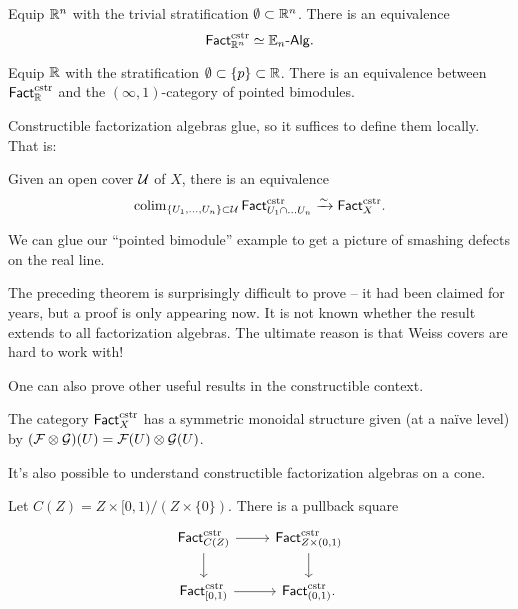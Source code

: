 \begin{thm}[Lurie]
	Equip $\mathbb{R}^n$ with the trivial stratification $\emptyset \subset \mathbb{R}^n$.
	There is an equivalence
	\[
		\mathsf{Fact}_{\mathbb{R}^n}^{\mathrm{cstr}} \simeq \mathbb{E}_n\textrm{-}\mathsf{Alg}.
	\]
\end{thm}

\begin{thm}
	Equip $\mathbb{R}$ with the stratification $\emptyset \subset \{ p \} \subset \mathbb{R}$.
	There is an equivalence between $\mathsf{Fact}_{\mathbb{R}}^{\mathrm{cstr}}$ and the $(\infty, 1)$-category of pointed bimodules. 
\end{thm}

Constructible factorization algebras glue, so it suffices to define them locally.
That is:

\begin{thm}
	Given an open cover $\mathcal{U}$ of $X$, there is an equivalence
	\[
		\operatorname{colim}_{\{U_1, \dots, U_n\} \subset \mathcal{U}} \mathsf{Fact}_{U_1 \cap \dots U_n}^{\mathrm{cstr}} \xrightarrow{\sim} \mathsf{Fact}_X^{\mathrm{cstr}}.
	\]
\end{thm}

\begin{ex}
	We can glue our ``pointed bimodule'' example to get a picture of smashing defects on the real line.
\end{ex}

The preceding theorem is surprisingly difficult to prove -- it had been claimed for years, but a proof is only appearing now.
It is not known whether the result extends to all factorization algebras.
The ultimate reason is that Weiss covers are hard to work with!

One can also prove other useful results in the constructible context.

\begin{thm}[KSW]
	The category $\mathsf{Fact}_X^{\mathrm{cstr}}$ has a symmetric monoidal structure given (at a na\"ive level) by $(\mathcal{F} \otimes \mathcal{G})(U) = \mathcal{F}(U) \otimes \mathcal{G}(U)$.
\end{thm}

It's also possible to understand constructible factorization algebras on a cone.

\begin{thm}
	Let $C(Z) = Z \times [0, 1) / (Z \times \{0\})$.
	There is a pullback square
	\[
		\begin{tikzcd}
			\Fact_{C(Z)}\cstr \rar \dar & \Fact_{Z \times (0,1)}\cstr \dar \\
			\Fact_{[0, 1)}\cstr \rar & \Fact_{(0,1)}\cstr.
		\end{tikzcd}
	\]
\end{thm}

